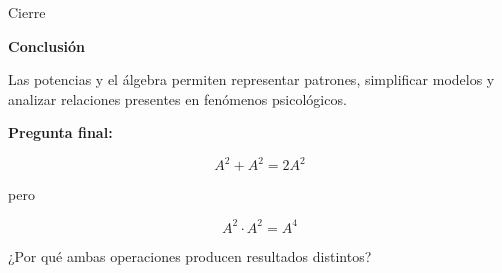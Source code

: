 \documentclass[aspectratio=169]{beamer}
\begin{document}
	
	\begin{frame}{Cierre}
		\begin{center}
			{\Huge \textbf{Conclusión}}
			
			\vspace{0.5cm}
			
			\Large
			Las potencias y el álgebra permiten representar patrones, simplificar modelos y analizar relaciones presentes en fenómenos psicológicos.
			
			\vspace{0.7cm}
			
			\textbf{Pregunta final:}
			
			\[
			A^2+A^2=2A^2
			\]
			
			pero
			
			\[
			A^2\cdot A^2=A^4
			\]
			
			\vspace{0.4cm}
			
			¿Por qué ambas operaciones producen resultados distintos?
		\end{center}
	\end{frame}
	
\end{document}
